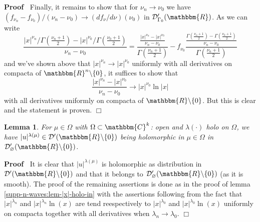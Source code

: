 \documentclass{article}
\renewenvironment{proof}{\noindent\textbf{Proof\ }}{\hspace*{\fill}$\Box$\medskip}
\newtheorem{lemma}[proposition]{Lemma}
\theoremstyle{remark}
\begin{document}
\begin{proof}
  Finally, it remains to show that for $\nu_n \rightarrow \nu_0$ we have
  $(f_{\nu_n} - f_{\nu_0}) / (\nu_n - \nu_0) \rightarrow (d f_{\nu} / d \nu)
  (\nu_0)$ in $\mathcal{D}'_{\Gamma_0} (\mathbbm{R})$. As we can write
  \[ \frac{| x |^{\nu_n} / \Gamma \left( \frac{\nu_n + 1}{2} \right) - | x
     |^{\nu_0} / \Gamma \left( \frac{\nu_0 + 1}{2} \right)}{\nu_n - \nu_0} =
     \frac{\frac{| x |^{\nu_n} - | x |^{\nu_0}}{\nu_n - \nu_0}}{\Gamma \left(
     \frac{\nu_n + 1}{2} \right)} - f_{\nu_0} \frac{\frac{\Gamma \left(
     \frac{\nu_n + 1}{2} \right) - \Gamma \left( \frac{\nu_0 + 1}{2}
     \right)}{\nu_n - \nu_0}}{\Gamma \left( \frac{\nu_n + 1}{2} \right)} \]
  and we've shown above that $| x |^{\nu_n} \rightarrow | x |^{\nu_0}$
  uniformly with all derivatives on compacta of $\mathbbm{R}^n \backslash \{ 0
  \}$, it suffices to show that
  \[ \frac{| x |^{\nu_n} - | x |^{\nu_0}}{\nu_n - \nu_0} \rightarrow | x
     |^{\nu_0} \ln | x | \]
  with all derivatives uniformly on compacta of $\mathbbm{R}\backslash \{ 0
  \}$. But this is clear and the statement is proven.
\end{proof}

\begin{lemma}
  \label{k-finite:lem-abs-is-holo}For $\mu \in \Omega$ with $\Omega \subset
  \mathbbm{C}^k$: open and $\lambda (\cdot)$ holo on $\Omega$, we have $| u
  |^{\lambda (\mu)} \in \mathcal{D}' (\mathbbm{R}\backslash \{ 0 \})$ being
  holomorphic in $\mu \in \Omega$ in $\mathcal{D}'_{\varnothing}
  (\mathbbm{R}\backslash \{ 0 \})$.
\end{lemma}

\begin{proof}
  It is clear that $| u |^{\lambda (\mu)}$ is holomorphic as distribution in
  $\mathcal{D}' (\mathbbm{R}\backslash \{ 0 \})$ and that it belongs to
  $\mathcal{D}'_{\varnothing} (\mathbbm{R}\backslash \{ 0 \})$ (as it is
  smooth). The proof of the remaining assertions is done as in the proof of
  lemma \ref{supp-n-waves:lem-|x|-holo-in} with the assertions following from
  the fact that $| x |^{\lambda_n}$ and $| x |^{\lambda_n} \ln (x)$ are tend
  reespectively to $| x |^{\lambda_0}$ and $| x |^{\lambda_0} \ln (x)$
  uniformly on compacta together with all derivatives when $\lambda_n
  \rightarrow \lambda_0$.
\end{proof}
\end{document}
